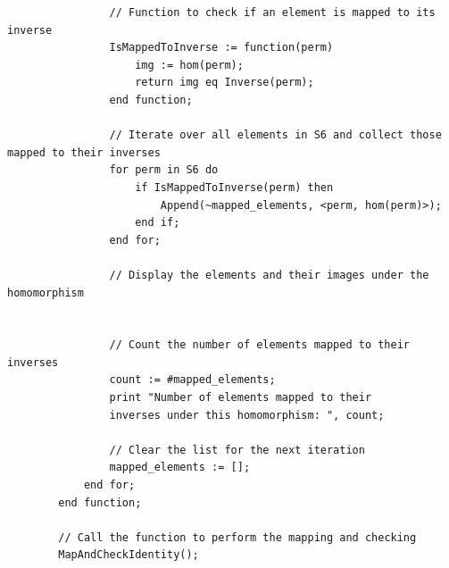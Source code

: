 \documentclass[oneside]{amsart}
\theoremstyle{plain}
\theoremstyle{definition}
\theoremstyle{remark}
\begin{document}
\begin{verbatim}
                // Function to check if an element is mapped to its inverse
                IsMappedToInverse := function(perm)
                    img := hom(perm);
                    return img eq Inverse(perm);
                end function;
        
                // Iterate over all elements in S6 and collect those mapped to their inverses
                for perm in S6 do
                    if IsMappedToInverse(perm) then
                        Append(~mapped_elements, <perm, hom(perm)>);
                    end if;
                end for;
                
                // Display the elements and their images under the homomorphism
          
        
                // Count the number of elements mapped to their inverses
                count := #mapped_elements;
                print "Number of elements mapped to their
                inverses under this homomorphism: ", count;
                
                // Clear the list for the next iteration
                mapped_elements := [];
            end for;
        end function;
        
        // Call the function to perform the mapping and checking
        MapAndCheckIdentity();
    \end{verbatim}
\end{document}
